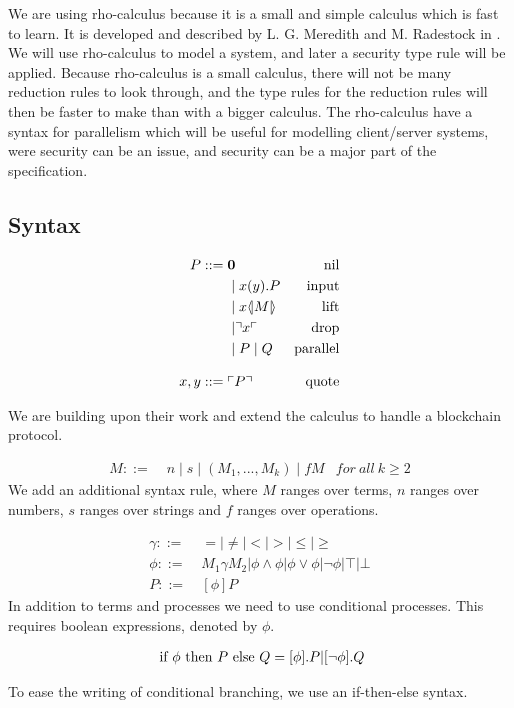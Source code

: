 We are using rho-calculus because it is a small and simple calculus which is fast to learn.
It is developed and described by L. G. Meredith and M. Radestock in \citep{Meredith2005}.
We will use rho-calculus to model a system, and later a security type rule will be applied.
Because rho-calculus is a small calculus, there will not be many reduction rules to look through, and the type rules for the reduction rules will then be faster to make than with a bigger calculus.
The rho-calculus have a syntax for parallelism which will be useful for modelling client/server systems, were security can be an issue, and security can be a major part of the specification. 

\subsection{Syntax}
\begin{align*}
    P  ::= \; &  \mathbf{0} & \text{nil} \\
      & \mid x(y).P & \text{input} \\
      & \mid x \langle \! | M | \! \rangle & \text{lift} \\
      & \mid \urcorner x \ulcorner & \text{drop} \\
      & \mid P \mid Q & \text{parallel} \\[3mm]
    x,y ::= \; & \ulcorner P \urcorner & \text{quote}\\
\end{align*}

We are building upon their work and extend the calculus to handle a blockchain protocol.

\begin{align*}
M::=\; & n \mid s \mid (M_1,...,M_k) \mid fM &for\ all\ k \geq 2
\end{align*}
We add an additional syntax rule, where $M$ ranges over terms, $n$ ranges over numbers, $s$ ranges over strings and $f$ ranges over operations.

\begin{align*}
\gamma ::=& \ =|\neq|<|>|\leq|\geq\\
\phi ::=& \ M_1\gamma M_2|\phi\land\phi|\phi\lor\phi|\neg\phi|\top|\bot\\
P::=& \ [\phi] P
\end{align*}
In addition to terms and processes we need to use conditional processes. This requires boolean expressions, denoted by \ensuremath{\phi}.

\begin{align*}
	\text{ if }\phi\text{ then }P\text{ else }Q = [\phi].P | [\neg \phi].Q
\end{align*}

To ease the writing of conditional branching, we use an if-then-else syntax.